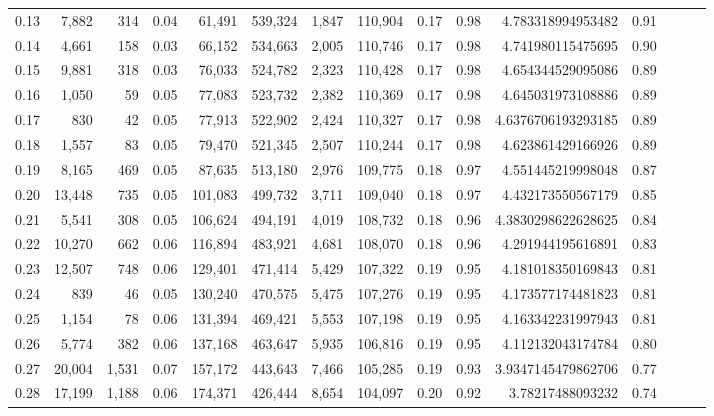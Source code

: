 \begin{tabular}{rrrrrrrrrrrrrrr}
0.13 &   7,882 &    314 &  0.04 &   61,491 &  539,324 &    1,847 &  110,904 &  0.17 &  0.98 &     4.783318994953482 &      0.91 \\
0.14 &   4,661 &    158 &  0.03 &   66,152 &  534,663 &    2,005 &  110,746 &  0.17 &  0.98 &     4.741980115475695 &      0.90 \\
0.15 &   9,881 &    318 &  0.03 &   76,033 &  524,782 &    2,323 &  110,428 &  0.17 &  0.98 &     4.654344529095086 &      0.89 \\
0.16 &   1,050 &     59 &  0.05 &   77,083 &  523,732 &    2,382 &  110,369 &  0.17 &  0.98 &     4.645031973108886 &      0.89 \\
0.17 &     830 &     42 &  0.05 &   77,913 &  522,902 &    2,424 &  110,327 &  0.17 &  0.98 &    4.6376706193293185 &      0.89 \\
0.18 &   1,557 &     83 &  0.05 &   79,470 &  521,345 &    2,507 &  110,244 &  0.17 &  0.98 &     4.623861429166926 &      0.89 \\
0.19 &   8,165 &    469 &  0.05 &   87,635 &  513,180 &    2,976 &  109,775 &  0.18 &  0.97 &     4.551445219998048 &      0.87 \\
0.20 &  13,448 &    735 &  0.05 &  101,083 &  499,732 &    3,711 &  109,040 &  0.18 &  0.97 &     4.432173550567179 &      0.85 \\
0.21 &   5,541 &    308 &  0.05 &  106,624 &  494,191 &    4,019 &  108,732 &  0.18 &  0.96 &    4.3830298622628625 &      0.84 \\
0.22 &  10,270 &    662 &  0.06 &  116,894 &  483,921 &    4,681 &  108,070 &  0.18 &  0.96 &     4.291944195616891 &      0.83 \\
0.23 &  12,507 &    748 &  0.06 &  129,401 &  471,414 &    5,429 &  107,322 &  0.19 &  0.95 &     4.181018350169843 &      0.81 \\
0.24 &     839 &     46 &  0.05 &  130,240 &  470,575 &    5,475 &  107,276 &  0.19 &  0.95 &     4.173577174481823 &      0.81 \\
0.25 &   1,154 &     78 &  0.06 &  131,394 &  469,421 &    5,553 &  107,198 &  0.19 &  0.95 &     4.163342231997943 &      0.81 \\
0.26 &   5,774 &    382 &  0.06 &  137,168 &  463,647 &    5,935 &  106,816 &  0.19 &  0.95 &     4.112132043174784 &      0.80 \\
0.27 &  20,004 &  1,531 &  0.07 &  157,172 &  443,643 &    7,466 &  105,285 &  0.19 &  0.93 &    3.9347145479862706 &      0.77 \\
0.28 &  17,199 &  1,188 &  0.06 &  174,371 &  426,444 &    8,654 &  104,097 &  0.20 &  0.92 &      3.78217488093232 &      0.74 \\

\end{tabular}
